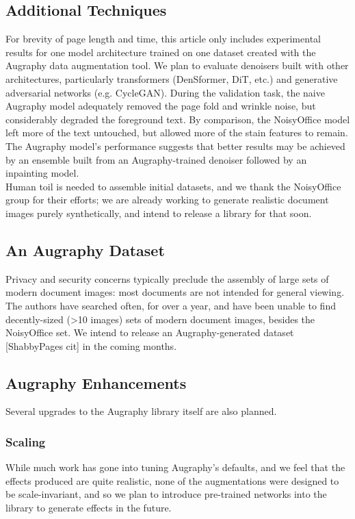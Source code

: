 \documentclass[runningheads]{article}
\begin{document}
\subsection{Additional Techniques}
\label{sec:org91f73b0}
For brevity of page length and time, this article only includes experimental results for one model architecture trained on one dataset created with the Augraphy data augmentation tool. We plan to evaluate denoisers built with other architectures, particularly transformers (DenSformer, DiT, etc.)
and generative adversarial networks (e.g. CycleGAN). During the validation task, the naive Augraphy model adequately removed the page fold and wrinkle noise, but considerably degraded the foreground text. By comparison, the NoisyOffice model left more of the text untouched, but allowed more of the stain features to remain. The Augraphy model's performance suggests that better results may be achieved by an ensemble built from an Augraphy-trained denoiser followed by an inpainting model.\\

Human toil is needed to assemble initial datasets, and we thank the NoisyOffice group for their efforts; we are already working to generate realistic document images purely synthetically, and intend to release a library for that soon.

\subsection{An Augraphy Dataset}
\label{sec:orgcf7613c}
Privacy and security concerns typically preclude the assembly of large sets of modern document images: most documents are not intended for general viewing. The authors have searched often, for over a year, and have been unable to find decently-sized (>10 images) sets of modern document images, besides the NoisyOffice set. We intend to release an Augraphy-generated dataset [ShabbyPages cit] in the coming months.

\subsection{Augraphy Enhancements}
\label{sec:orgea8aa95}
Several upgrades to the Augraphy library itself are also planned.
\subsubsection{Scaling}
\label{sec:orgd598e64}
While much work has gone into tuning Augraphy's defaults, and we feel that the effects produced are quite realistic, none of the augmentations were designed to be scale-invariant, and so we plan to introduce pre-trained networks into the library to generate effects in the future.
\end{document}
